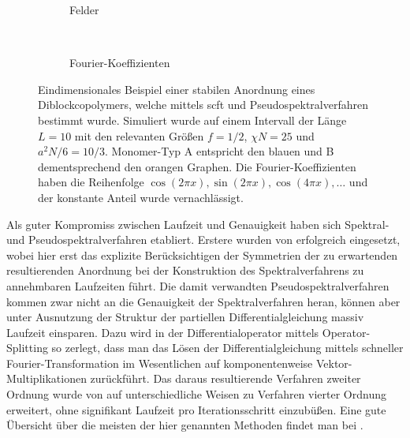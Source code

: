 \begin{figure}[tb]
    \centering
    \begin{subfigure}[b]{0.475\textwidth}
        \centering
        
        \caption{Felder}
    \end{subfigure}
    ~
    \begin{subfigure}[b]{0.475\textwidth}
        \centering
        
        \caption{Fourier-Koeffizienten}
    \end{subfigure}
    \caption[%
    Eindimensionales Beispiel einer stabilen Anordnung eines Diblockcopolymers
    ]{%
        Eindimensionales Beispiel einer stabilen Anordnung eines Diblockcopolymers, welche mittels \ac{scft} und Pseudospektralverfahren bestimmt wurde.
        Simuliert wurde auf einem Intervall der Länge $L = 10$ mit den relevanten Größen $f = 1/2$, $\chi N = 25$ und $a^{2} N / 6 = 10 / 3$.
        Monomer-Typ A entspricht den blauen und B dementsprechend den orangen Graphen.
        Die Fourier-Koeffizienten haben die Reihenfolge $\cos(2 \pi x), \sin(2 \pi x), \cos(4 \pi x), \dots$ und der konstante Anteil wurde vernachlässigt.
    }
    \label{figure:felder_nach_iterationsverfahren}
\end{figure}

Als guter Kompromiss zwischen Laufzeit und Genauigkeit haben sich Spektral- und Pseudospektralverfahren etabliert.
Erstere wurden von \textcite{Matsen:1994bz} erfolgreich eingesetzt, wobei hier erst das explizite Berücksichtigen der Symmetrien der zu erwartenden resultierenden Anordnung bei der Konstruktion des Spektralverfahrens zu annehmbaren Laufzeiten führt.
Die damit verwandten Pseudospektralverfahren kommen zwar nicht an die Genauigkeit der Spektralverfahren heran, können aber unter Ausnutzung der Struktur der partiellen Differentialgleichung massiv Laufzeit einsparen.
Dazu wird in \cite{Rasmussen:2002kt} der Differentialoperator mittels Operator-Splitting so zerlegt, dass man das Lösen der Differentialgleichung mittels schneller Fourier-Transformation im Wesentlichen auf komponentenweise Vektor-Multiplikationen zurückführt.
Das daraus resultierende Verfahren zweiter Ordnung wurde von \cite{GarciaCervera:2006uu,Ranjan:2007kl} auf unterschiedliche Weisen zu Verfahren vierter Ordnung erweitert, ohne signifikant Laufzeit pro Iterationsschritt einzubüßen.
Eine gute Übersicht über die meisten der hier genannten Methoden findet man bei \textcites[Section 3.6]{Fredrickson:2006th}{Audus:2013ep}.

